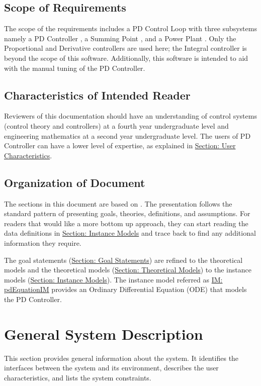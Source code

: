 \documentclass[12pt]{article}
\begin{document}
\subsection{Scope of Requirements}
\label{Sec:ReqsScope}
The scope of the requirements includes a PD Control Loop  with three subsystems namely a  PD Controller , a Summing Point , and a Power Plant . Only  the Proportional and Derivative controllers are used here;  the Integral controller is beyond the scope of this software. Additionally, this software is intended to aid with the manual  tuning of the PD Controller.

\subsection{Characteristics of Intended Reader}
\label{Sec:ReaderChars}
Reviewers of this documentation should have an understanding of control systems (control theory and controllers) at a fourth year undergraduate level and engineering mathematics at a second year undergraduate level. The users of PD Controller can have a lower level of expertise, as explained in \hyperref[Sec:UserChars]{Section: User Characteristics}.

\subsection{Organization of Document}
\label{Sec:DocOrg}
The sections in this document are based on  \cite{smithLai2005}. The presentation follows the standard pattern of presenting goals, theories, definitions, and assumptions. For readers that would like a more bottom up approach, they can start reading the data definitions in \hyperref[Sec:IMs]{Section: Instance Models} and trace back to find any additional information they require.

The goal statements (\hyperref[Sec:GoalStmt]{Section: Goal Statements}) are refined to the theoretical models and the theoretical models (\hyperref[Sec:TMs]{Section: Theoretical Models}) to the instance models (\hyperref[Sec:IMs]{Section: Instance Models}). The instance model referred as \hyperref[IM:pdEquationIM]{IM: pdEquationIM}  provides an Ordinary Differential Equation (ODE) that   models the PD Controller.

\section{General System Description}
\label{Sec:GenSysDesc}
This section provides general information about the system. It identifies the interfaces between the system and its environment, describes the user characteristics, and lists the system constraints.
\end{document}
